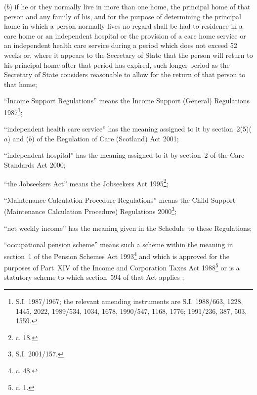 \documentclass[12pt,a4paper]{article}
\begin{document}
\begin{enumerate}
\begin{enumerate}
($b$) 
if he or they normally live in more than one home, the principal home of that person and any family of his, and for the purpose of determining the principal home in which a person normally lives no regard shall be had to residence in 
a care home or an independent hospital or the provision of a care home service or an independent health care service  %
during a period which does not exceed 52 weeks or, where it appears to the Secretary of State that the person will return to his principal home after that period has expired, such longer period as the Secretary of State considers reasonable to allow for the return of that person to that home;
\end{enumerate}

“Income Support Regulations” means the Income Support (General) Regulations 1987\footnote{\frenchspacing S.I. 1987/1967; the relevant amending instruments are S.I. 1988/663, 1228, 1445, 2022, 1989/534, 1034, 1678, 1990/547, 1168, 1776; 1991/236, 387, 503, 1559.};

“independent health care service” has the meaning assigned to it by section~2(5)($a$)  and ($b$)  of the Regulation of Care (Scotland) Act 2001;

“independent hospital” has the meaning assigned to it by section~2 of the Care Standards Act 2000;

“the Jobseekers Act” means the Jobseekers Act 1995\footnote{ c. 18.};

“Maintenance Calculation Procedure Regulations” means the Child Support (Maintenance Calculation Procedure) Regulations 2000\footnote{\frenchspacing S.I. 2001/157.};

“net weekly income” has the meaning given in the Schedule~to these Regulations;


“occupational pension scheme” means such a scheme within the meaning in section~1 of the Pension Schemes Act 1993\footnote{ c. 48.} and which is approved for the purposes of Part~XIV of the Income and Corporation Taxes Act 1988\footnote{ c. 1.}
or is a statutory scheme to which section~594 of that Act applies%
;


\end{enumerate}
\end{document}
